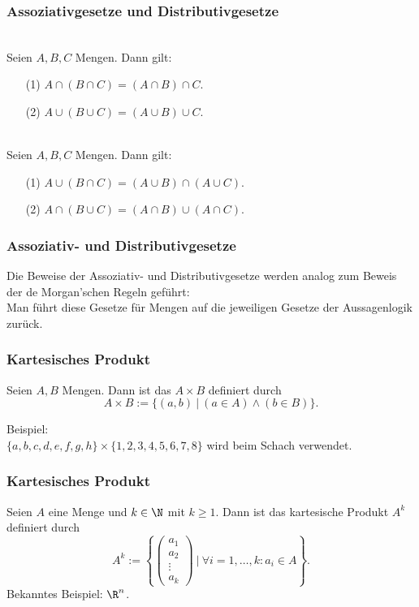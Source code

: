 \begin{frame}\frametitle{Assoziativgesetze und Distributivgesetze}
	
	\\
	Seien $A,B,C$ Mengen. Dann gilt:
	\begin{itemize}
		\item[(1)] $A\cap(B \cap C) = (A \cap B) \cap C.$
		\item[(2)] $A\cup(B \cup C) = (A \cup B) \cup C.$
	\end{itemize}\pause
	\vfill

	\\
	Seien $A,B,C$ Mengen. Dann gilt:
	\begin{itemize}
		\item[(1)] $A\cup(B \cap C) = (A \cup B) \cap (A\cup C).$
		\item[(2)] $A\cap(B \cup C) = (A \cap B) \cup (A\cap C).$
	\end{itemize}
	
\end{frame}
%
%
\begin{frame}\frametitle{Assoziativ- und Distributivgesetze}

	Die Beweise der Assoziativ- und Distributivgesetze werden analog zum Beweis der de Morgan'schen Regeln geführt: \\
	Man führt diese Gesetze für Mengen auf die jeweiligen Gesetze der Aussagenlogik zurück.
	
\end{frame}
%
%
\begin{frame}\frametitle{Kartesisches Produkt}

	Seien $A,B$ Mengen. Dann ist das  $A\times B$ definiert durch
	$$
		A\times B := \big\{ (a,b) ~|~ (a\in A) \land (b\in B) \big\}.
	$$
	
	\vfill
	\pause
	Beispiel:\\
	$ \{a,b,c,d,e,f,g,h \} \times \{1,2,3,4,5,6,7,8\}$ wird beim Schach verwendet.
\end{frame}
%
%
\begin{frame}\frametitle{Kartesisches Produkt}

	Seien $A$ eine Menge und $k\in \N$ mit $k\geq 1$. Dann ist das kartesische Produkt $A^k$ definiert durch
	$$
		A^k := \left\{ 
				\begin{pmatrix} a_1\\a_2\\\vdots \\ a_k \end{pmatrix}
				 ~\Big|~ \forall i=1,\ldots,k : a_i \in A \right\}.
	$$
	\vfill
	Bekanntes Beispiel: $\R^n$.
\end{frame}
%

